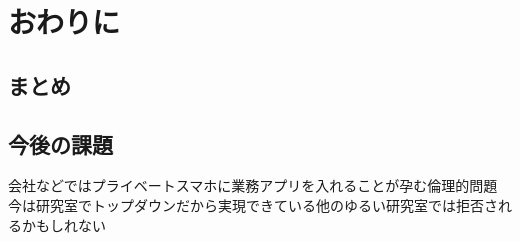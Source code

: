 \chapter{おわりに}
\thispagestyle{myheadings}

\section{まとめ}


\section{今後の課題}




会社などではプライベートスマホに業務アプリを入れることが孕む倫理的問題
今は研究室でトップダウンだから実現できている他のゆるい研究室では拒否されるかもしれない
